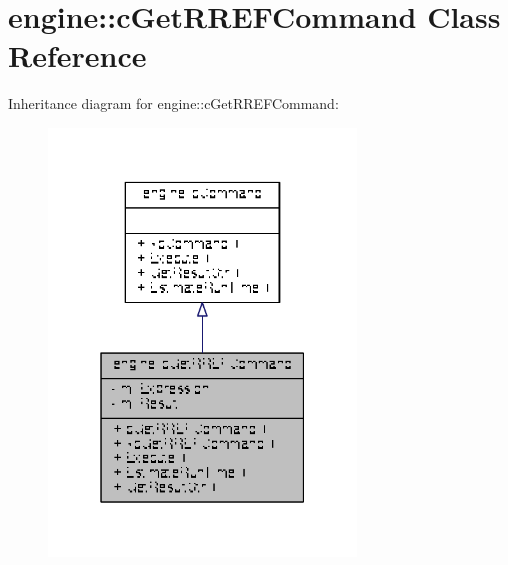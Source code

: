 \hypertarget{classengine_1_1cGetRREFCommand}{\section{engine\-:\-:c\-Get\-R\-R\-E\-F\-Command Class Reference}
\label{classengine_1_1cGetRREFCommand}
}


Inheritance diagram for engine\-:\-:c\-Get\-R\-R\-E\-F\-Command\-:
\nopagebreak
\begin{figure}[H]
\begin{center}
\leavevmode
\includegraphics[width=232pt]{classengine_1_1cGetRREFCommand__inherit__graph}
\end{center}
\end{figure}


